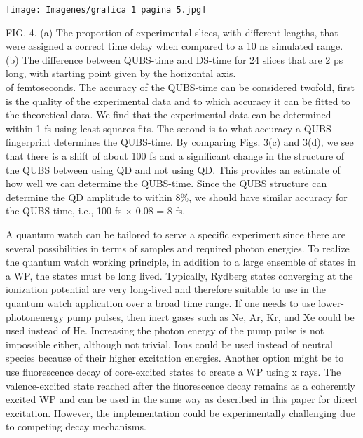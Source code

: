 \documentclass[7pt]{article}
\newenvironment{Figura}
{\par\medskip\noindent\minipage{\linewidth}}
  {\endminipage\par\medskip}
\begin{document}
\newpage
\fancyhead[C]{ } 
\fancyfoot[L]{}
\fancyfoot[R]{ }
\begin{multicols}{2}
    

    \begin{Figura}
     \centering
    \texttt{[image: Imagenes/grafica 1 pagina 5.jpg]}
    \label{grafica 1 pagina 5}   
    \end{Figura}

    \small{}
    
   FIG. 4. (a) The proportion of experimental slices, with different lengths, that were assigned a correct time delay when compared to a 10 ns simulated range. (b) The difference between QUBS-time and DS-time for 24 slices that are 2 ps long, with starting point given by the horizontal axis.\\
\newline
of femtoseconds. The accuracy of the QUBS-time can be considered twofold, first is the quality of the experimental data and to which accuracy it can be fitted to the theoretical data. We find that the experimental data can be determined within 1 fs using least-squares fits. The second is to what accuracy a QUBS fingerprint determines the QUBS-time. By comparing Figs. 3(c) and 3(d), we see that there is a shift of about 100 fs and a significant change in the structure of the QUBS between using QD and not using QD. This provides an estimate of how well we can determine the QUBS-time. Since the QUBS structure can determine the QD amplitude to within 8\%, we should have similar accuracy for the QUBS-time, i.e., 100 fs × 0.08 = 8 fs.

A quantum watch can be tailored to serve a specific experiment since there are several possibilities in terms of samples and required photon energies. To realize the quantum watch
working principle, in addition to a large ensemble of states in a WP, the states must be long lived. Typically, Rydberg states converging at the ionization potential are very long-lived and therefore suitable to use in the quantum watch application over a broad time range. If one needs to use lower-photonenergy pump pulses, then inert gases such as Ne, Ar, Kr, and Xe could be used instead of He. Increasing the photon energy of the pump pulse is not impossible either, although not trivial. Ions could be used instead of neutral species because of their higher excitation energies. Another option might be to use fluorescence decay of core-excited states to create a WP using x rays. The valence-excited state reached after the fluorescence decay remains as a coherently excited WP and can be used in the same way as described in this paper for direct excitation. However, the implementation could be experimentally challenging due to competing decay mechanisms.


\end{multicols}
\end{document}
